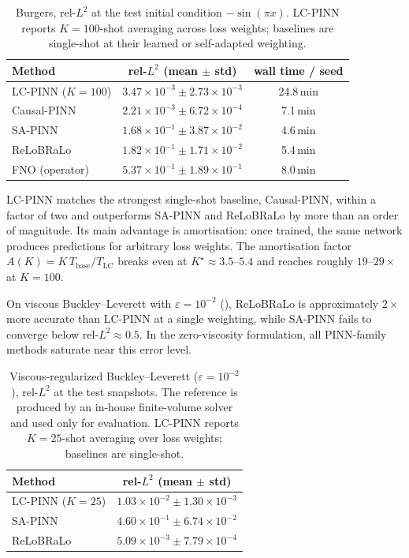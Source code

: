 \documentclass{article}
\theoremstyle{plain}
\theoremstyle{definition}
\theoremstyle{remark}
\begin{document}
\begin{table}[!t]
\centering
\caption{Burgers, rel-$L^2$ at the test initial condition
$-\sin(\pi x)$. LC-PINN reports $K=100$-shot averaging across
loss weights; baselines are single-shot at their learned or
self-adapted weighting.}
\label{tab:burgers}
\small
\begin{tabular}{lcc}
\toprule
Method & rel-$L^2$ (mean $\pm$ std) & wall time / seed \\
\midrule
LC-PINN ($K\!=\!100$) & $3.47 \times 10^{-3} \pm 2.73 \times 10^{-3}$ & 24.8\,min \\
Causal-PINN           & $2.21 \times 10^{-3} \pm 6.72 \times 10^{-4}$ &  7.1\,min \\
SA-PINN               & $1.68 \times 10^{-1} \pm 3.87 \times 10^{-2}$ &  4.6\,min \\
ReLoBRaLo             & $1.82 \times 10^{-1} \pm 1.71 \times 10^{-2}$ &  5.4\,min \\
FNO (operator)        & $5.37 \times 10^{-1} \pm 1.89 \times 10^{-1}$ &  8.0\,min \\
\bottomrule
\end{tabular}
\end{table}

LC-PINN matches the strongest single-shot baseline, Causal-PINN,
within a factor of two and outperforms SA-PINN and ReLoBRaLo by more
than an order of magnitude. Its main advantage is amortisation: once
trained, the same network produces predictions for arbitrary loss
weights. The amortisation factor
$A(K)=K\,T_{\mathrm{base}}/T_{\mathrm{LC}}$ breaks even at
$K^\star \approx 3.5$--$5.4$ and reaches roughly $19$--$29\times$ at
$K=100$.

On viscous Buckley--Leverett with $\varepsilon=10^{-2}$
(), ReLoBRaLo is approximately $2\times$ more accurate
than LC-PINN at a single weighting, while SA-PINN fails to converge
below rel-$L^2 \approx 0.5$. In the zero-viscosity formulation, all
PINN-family methods saturate near this error level.

\begin{table}[!t]
\centering
\caption{Viscous-regularized Buckley--Leverett
($\varepsilon=10^{-2}$), rel-$L^2$ at the test snapshots. The
reference is produced by an in-house finite-volume solver and used
only for evaluation. LC-PINN reports $K=25$-shot averaging over
loss weights; baselines are single-shot.}
\label{tab:bl}
\small
\begin{tabular}{lc}
\toprule
Method & rel-$L^2$ (mean $\pm$ std) \\
\midrule
LC-PINN ($K\!=\!25$) & $1.03 \times 10^{-2} \pm 1.30 \times 10^{-3}$ \\
SA-PINN              & $4.60 \times 10^{-1} \pm 6.74 \times 10^{-2}$ \\
ReLoBRaLo            & $5.09 \times 10^{-3} \pm 7.79 \times 10^{-4}$ \\
\bottomrule
\end{tabular}
\end{table}
\end{document}
